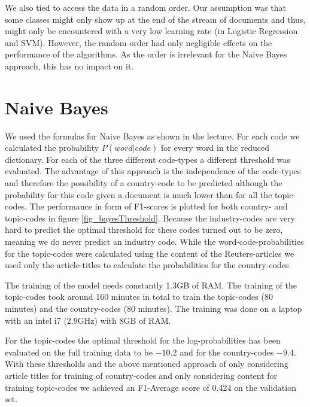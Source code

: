 \documentclass{article}
\begin{document}
We also tied to access the data in a random order. Our assumption was that some classes might only show up at the end of the stream of documents and thus, might only be encountered with a very low learning rate (in Logistic Regression and SVM).
However, the random order had only negligible effects on the performance of the algorithms. As the order is irrelevant for the Naive Bayes approach, this has no impact on it.

\section*{Naive Bayes}
We used the formulas for Naive Bayes as shown in the lecture. For each code we calculated the probability $P(word | code)$ for every word in the reduced dictionary.
For each of the three different code-types a different threshold was evaluated. The advantage of this approach is the independence of the code-types and therefore the possibility of a country-code to be predicted although the probability for this code given a document is much lower than for all the topic-codes. The performance in form of F1-scores is plotted for both country- and topic-codes in figure \ref{fig_bayesThreshold}. Because the industry-codes are very hard to predict the optimal threshold for these codes turned out to be zero, meaning we do never predict an industry code.
While the word-code-probabilities for the topic-codes were calculated using the content of the Reuters-articles we used only the article-titles to calculate the probabilities for the country-codes. 

The training of the model needs constantly 1.3GB of RAM. The training of the topic-codes took around 160 minutes in total to train the topic-codes (80 minutes) and the country-codes (80 minutes). The training was done on a laptop with an intel i7 (2.9GHz) with 8GB of RAM.

For the topic-codes the optimal threshold for the log-probabilities has been evaluated on the full training data to be $-10.2$ and for the country-codes $-9.4$. With these thresholds and the above mentioned approach of only considering article titles for training of country-codes and only considering content for training topic-codes we achieved an F1-Average score of 0.424 on the validation set.
\end{document}
